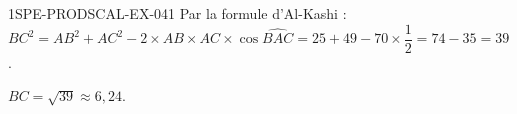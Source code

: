 \begin{corrige}{1SPE-PRODSCAL-EX-041}
Par la formule d'Al-Kashi :
$BC^2 = AB^2 + AC^2 - 2 \times AB \times AC \times \cos\widehat{BAC} = 25 + 49 - 70 \times \dfrac{1}{2} = 74 - 35 = 39$.

$BC = \sqrt{39} \approx 6{,}24$.
\end{corrige}
